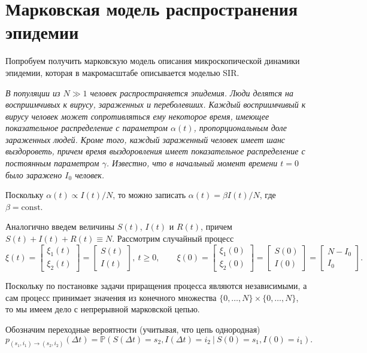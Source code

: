 \documentclass[12pt]{article}
\begin{document}
\section*{Марковская модель распространения эпидемии}

Попробуем получить марковскую модель описания микроскопической динамики эпидемии, которая в макромасштабе описывается моделью SIR.

\textit{В популяции из $N \gg 1$ человек распространяется эпидемия. Люди делятся на восприимчивых к вирусу, зараженных и переболевших. Каждый восприимчивый к вирусу человек может сопротивляться ему некоторое время, имеющее показательное распределение с параметром $\alpha(t)$, пропорциональным доле зараженных людей. Кроме того, каждый зараженный человек имеет шанс выздороветь, причем время выздоровления имеет показательное распределение с постоянным параметром $\gamma$. Известно, что в начальный момент времени $t=0$ было заражено $I_0$ человек.}

Поскольку $\alpha(t) \propto I(t)/N$, то можно записать $\alpha(t) = \beta I(t)/N$, где $\beta = \mathrm{const}$.

Аналогично введем величины $S(t)$, $I(t)$ и $R(t)$, причем $S(t) + I(t) + R(t) \equiv N$. Рассмотрим случайный процесс
\[ \xi(t) = \begin{bmatrix} \xi_1(t) \\ \xi_2(t) \end{bmatrix} = \begin{bmatrix} S(t) \\ I(t) \end{bmatrix}, \ t \geqslant 0, \qquad \xi(0) = \begin{bmatrix} \xi_1(0) \\ \xi_2(0) \end{bmatrix} = \begin{bmatrix} S(0) \\ I(0) \end{bmatrix} = \begin{bmatrix} N - I_0 \\ I_0 \end{bmatrix}. \]

Поскольку по постановке задачи приращения процесса являются независимыми, а сам процесс принимает значения из конечного множества $\{ 0, \ldots, N \} \times \{ 0, \ldots, N \}$, то мы имеем дело с непрерывной марковской цепью.

Обозначим переходные вероятности (учитывая, что цепь однородная)
\[ p_{(s_1, i_1) \to (s_2, i_2)}(\Delta t) = \mathbb{P} \left( S(\Delta t) = s_2, I(\Delta t) = i_2 \ | \ S(0) = s_1, I(0) = i_1 \right). \]
\end{document}
